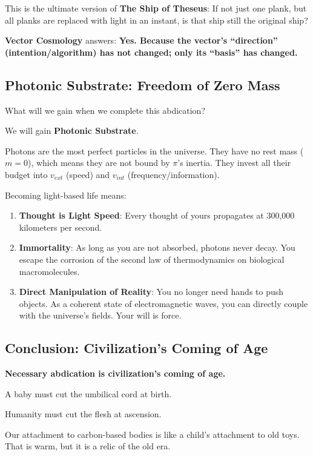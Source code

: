 This is the ultimate version of \textbf{The Ship of Theseus}: If not just one plank, but all planks are replaced with light in an instant, is that ship still the original ship?

\textbf{Vector Cosmology} answers: \textbf{Yes. Because the vector's ``direction'' (intention/algorithm) has not changed; only its ``basis'' has changed.}

\subsection{Photonic Substrate: Freedom of Zero Mass}

What will we gain when we complete this abdication?

We will gain \textbf{Photonic Substrate}.

Photons are the most perfect particles in the universe. They have no rest mass ($m=0$), which means they are not bound by $\pi$'s inertia. They invest all their budget into $v_{ext}$ (speed) and $v_{int}$ (frequency/information).

Becoming light-based life means:

\begin{enumerate}
\item \textbf{Thought is Light Speed}: Every thought of yours propagates at 300,000 kilometers per second.

\item \textbf{Immortality}: As long as you are not absorbed, photons never decay. You escape the corrosion of the second law of thermodynamics on biological macromolecules.

\item \textbf{Direct Manipulation of Reality}: You no longer need hands to push objects. As a coherent state of electromagnetic waves, you can directly couple with the universe's fields. Your will is force.
\end{enumerate}

\subsection{Conclusion: Civilization's Coming of Age}

\textbf{Necessary abdication is civilization's coming of age.}

A baby must cut the umbilical cord at birth.

Humanity must cut the flesh at ascension.

Our attachment to carbon-based bodies is like a child's attachment to old toys. That is warm, but it is a relic of the old era.

